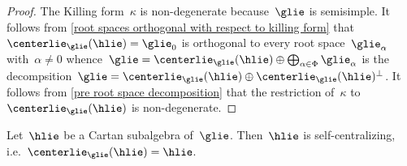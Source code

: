 \begin{proof}
  The Killing form~$\kappa$ is non-degenerate because~$\glie$ is semisimple.
  It follows from \cref{root spaces orthogonal with respect to killing form} that~$\centerlie_{\glie}(\hlie) = \glie_0$ is orthogonal to every root space~$\glie_\alpha$ with~$\alpha \neq 0$ whence~$\glie = \centerlie_{\glie}(\hlie) \oplus \bigoplus_{\alpha \in \Phi} \glie_\alpha$ is the decompsition~$\glie = \centerlie_{\glie}(\hlie) \oplus \centerlie_{\glie}(\hlie)^\perp$.
  It follows from \cref{pre root space decomposition} that the restriction of~$\kappa$ to~$\centerlie_{\glie}(\hlie)$ is non-degenerate.
\end{proof}


\begin{proposition}
  \label{csa are self-centralizing}
  Let~$\hlie$ be a Cartan subalgebra of~$\glie$.
  Then~$\hlie$ is self-centralizing, i.e.~$\centerlie_{\glie}(\hlie) = \hlie$.
\end{proposition}


